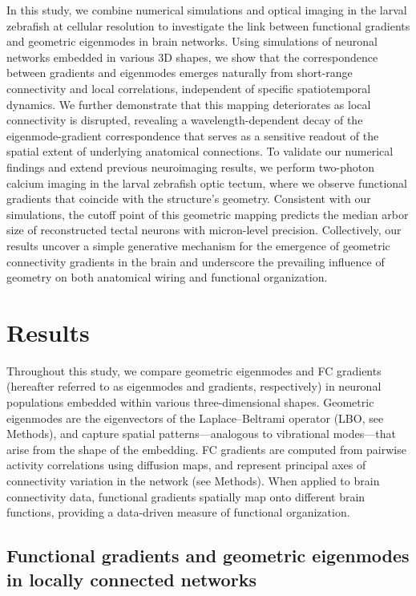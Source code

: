 \documentclass{article}
\begin{document}
In this study, we combine numerical simulations and optical imaging in the larval zebrafish at cellular resolution to investigate the link between functional gradients and geometric eigenmodes in brain networks. Using simulations of neuronal networks embedded in various 3D shapes, we show that the correspondence between gradients and eigenmodes emerges naturally from short-range connectivity and local correlations, independent of specific spatiotemporal dynamics. We further demonstrate that this mapping deteriorates as local connectivity is disrupted, revealing a wavelength-dependent decay of the eigenmode-gradient correspondence that serves as a sensitive readout of the spatial extent of underlying anatomical connections. To validate our numerical findings and extend previous neuroimaging results\cite{pang2023geometric}, we perform two-photon calcium imaging in the larval zebrafish optic tectum, where we observe functional gradients that coincide with the structure’s geometry. Consistent with our simulations, the cutoff point of this geometric mapping predicts the median arbor size of reconstructed tectal neurons with micron-level precision\cite{kunst2019cellular}. Collectively, our results uncover a simple generative mechanism for the emergence of geometric connectivity gradients in the brain and underscore the prevailing influence of geometry on both anatomical wiring and functional organization.

\section*{Results}

Throughout this study, we compare geometric eigenmodes and FC gradients (hereafter referred to as eigenmodes and gradients, respectively) in neuronal populations embedded within various three-dimensional shapes. Geometric eigenmodes are the eigenvectors of the Laplace–Beltrami operator (LBO, see Methods), and capture spatial patterns---analogous to vibrational modes---that arise from the shape of the embedding. FC gradients are computed from pairwise activity correlations using diffusion maps\cite{Coifman2006}, and represent principal axes of connectivity variation in the network (see Methods). When applied to brain connectivity data, functional gradients spatially map onto different brain functions, providing a data-driven measure of functional organization\cite{margulies2016situating}.

\subsection*{Functional gradients and geometric eigenmodes in locally connected networks}
\end{document}
